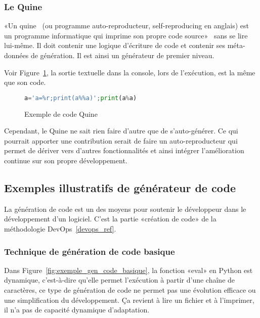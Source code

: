 \subsubsection{Le Quine}

«Un quine~\cite{sarkar2020quines} (ou programme auto-reproducteur, self-reproducing en anglais) est un programme informatique qui imprime son propre code source»~\cite{wiki_quine} sans se lire lui-même. Il doit contenir une logique d’écriture de code et contenir ses méta-données de génération. Il est ainsi un générateur de premier niveau.

Voir Figure~\ref{fig:exemple_quine}, la sortie textuelle dans la console, lors de l'exécution, est la même que son code.

\begin{figure}
\begin{lstlisting}[language=Python]
a='a=%r;print(a%%a)';print(a%a)
\end{lstlisting}
\caption{Exemple de code Quine}
\label{fig:exemple_quine}
\end{figure}

Cependant, le Quine ne sait rien faire d’autre que de s’auto-générer. Ce qui pourrait apporter une contribution serait de faire un auto-reproducteur qui permet de dériver vers d’autres fonctionnalités et ainsi intégrer l’amélioration continue sur son propre développement.

\subsection{Exemples illustratifs de générateur de code}

La génération de code est un des moyens pour soutenir le développeur dans le développement d’un logiciel. C’est la partie «création de code» de la méthodologie DevOps~\ref{devops_ref}.

\subsubsection{Technique de génération de code basique}

Dans Figure~\ref{fig:exemple_gen_code_basique}, la fonction «eval» en Python est dynamique, c'est-à-dire qu’elle permet l’exécution à partir d’une chaîne de caractères, ce type de génération de code ne permet pas une évolution efficace ou une simplification du développement. Ça revient à lire un fichier et à l'imprimer, il n’a pas de capacité dynamique d’adaptation.

